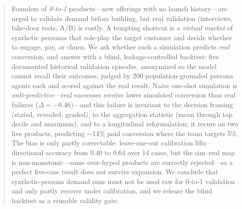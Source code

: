 \documentclass{article}
\begin{document}
\printAffiliationsAndNotice{}

\begin{abstract}
Founders of \emph{0-to-1} products---new offerings with no launch history---are
urged to validate demand before building, but real validation (interviews,
fake-door tests, A/B) is costly. A tempting shortcut is a \emph{virtual market} of
synthetic personas that role-play the target customer and decide whether to engage,
pay, or churn. We ask whether such a simulation predicts \emph{real} conversion,
and answer with a blind, leakage-controlled backtest: five documented historical
validation episodes, anonymized so the model cannot recall their outcomes, judged
by 200 population-grounded persona agents each and scored against the real result.
Naive one-shot simulation is \emph{anti-predictive}---real successes receive lower
simulated conversion than real failures ($\Delta=-0.46$)---and this failure is
invariant to the decision framing (stated, revealed, graded), to the aggregation
statistic (mean through top decile and maximum), and to a longitudinal
reformulation; it recurs on two live products, predicting $\sim$14\% paid
conversion where the team targets 5\%. The bias is only partly correctable:
leave-one-out calibration lifts directional accuracy from $0.40$ to $0.64$ over 14
cases, but the sim--real map is non-monotonic---some over-hyped products are
correctly rejected---so a perfect five-case result does not survive expansion. We
conclude that synthetic-persona demand sims must not be used raw for 0-to-1
validation and only partly recover under calibration, and we release the blind
backtest as a reusable validity gate.
\end{abstract}
\end{document}
